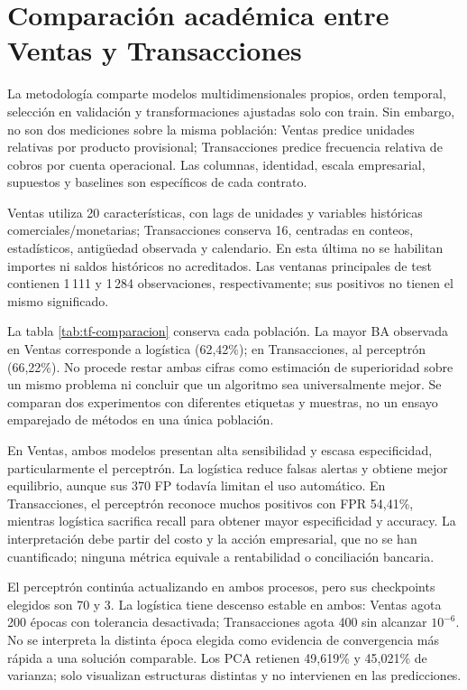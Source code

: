 \barrerapagina
\section{Comparación académica entre Ventas y Transacciones}
La metodología comparte modelos multidimensionales propios, orden temporal, selección en validación y transformaciones ajustadas solo con train. Sin embargo, no son dos mediciones sobre la misma población: Ventas predice unidades relativas por producto provisional; Transacciones predice frecuencia relativa de cobros por cuenta operacional. Las columnas, identidad, escala empresarial, supuestos y baselines son específicos de cada contrato.

Ventas utiliza 20 características, con lags de unidades y variables históricas comerciales/monetarias; Transacciones conserva 16, centradas en conteos, estadísticos, antigüedad observada y calendario. En esta última no se habilitan importes ni saldos históricos no acreditados. Las ventanas principales de test contienen 1\,111 y 1\,284 observaciones, respectivamente; sus positivos no tienen el mismo significado.

La tabla \ref{tab:tf-comparacion} conserva cada población. La mayor BA observada en Ventas corresponde a logística (62,42\%); en Transacciones, al perceptrón (66,22\%). No procede restar ambas cifras como estimación de superioridad sobre un mismo problema ni concluir que un algoritmo sea universalmente mejor. Se comparan dos experimentos con diferentes etiquetas y muestras, no un ensayo emparejado de métodos en una única población.

En Ventas, ambos modelos presentan alta sensibilidad y escasa especificidad, particularmente el perceptrón. La logística reduce falsas alertas y obtiene mejor equilibrio, aunque sus 370 FP todavía limitan el uso automático. En Transacciones, el perceptrón reconoce muchos positivos con FPR 54,41\%, mientras logística sacrifica recall para obtener mayor especificidad y accuracy. La interpretación debe partir del costo y la acción empresarial, que no se han cuantificado; ninguna métrica equivale a rentabilidad o conciliación bancaria.

El perceptrón continúa actualizando en ambos procesos, pero sus checkpoints elegidos son 70 y 3. La logística tiene descenso estable en ambos: Ventas agota 200 épocas con tolerancia desactivada; Transacciones agota 400 sin alcanzar $10^{-6}$. No se interpreta la distinta época elegida como evidencia de convergencia más rápida a una solución comparable. Los PCA retienen 49,619\% y 45,021\% de varianza; solo visualizan estructuras distintas y no intervienen en las predicciones.

